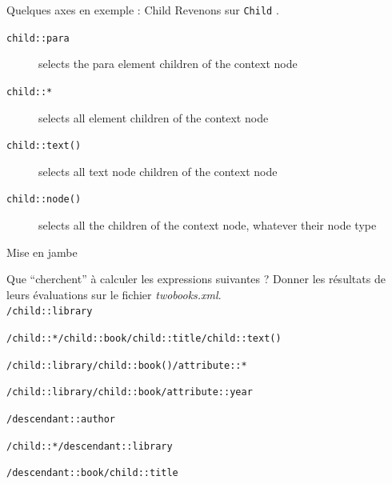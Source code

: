 \begin{frame}{Quelques axes en exemple : Child}
Revenons sur \texttt{Child} \cite{w3c/xpath}.

\begin{description}
\item[\verb?child::para?] selects the para element children of the context node

\item[\verb?child::*?] selects all element children of the context node

\item[\verb?child::text()?] selects all text node children of the context node

\item[\verb?child::node()?] selects all the children of the context node, whatever their node type
\end{description}


\end{frame}



\begin{frame}{Mise en jambe}

\begin{small}

\begin{exoblock}
Que ``cherchent'' \`a calculer les expressions suivantes ? Donner les résultats de leurs évaluations sur le fichier \textit{twobooks.xml}.\\

\verb?/child::library?

\verb?/child::*/child::book/child::title/child::text()? 

\verb?/child::library/child::book()/attribute::*?	

\verb?/child::library/child::book/attribute::year?	

\verb?/descendant::author? 


\verb?/child::*/descendant::library? 

\verb?/descendant::book/child::title? 

\end{exoblock}

\end{small}


\end{frame}


